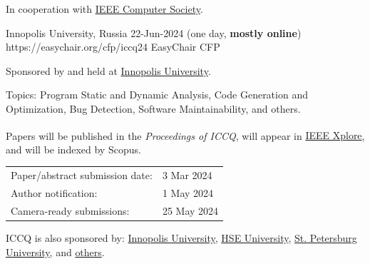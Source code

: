 \documentclass{../cfp}
\begin{document}
\PrintLogo{}



In cooperation
with
\href{https://conferences.ieee.org/conferences_events/conferences/conferencedetails/60895}{IEEE Computer Society}.

\vspace{6pt}

\PrintAddress
  {Innopolis University, Russia}
  {22-Jun-2024 (one day, \textbf{mostly online})}
  {https://easychair.org/cfp/iccq24}
  {EasyChair CFP}

\vspace{12pt}
%
%
\vspace{12pt}

Sponsored by and held at \href{https://innopolis.university/}{Innopolis University}.

Topics: Program Static and Dynamic Analysis,
Code Generation and Optimization,
Bug Detection, Software Maintainability, and others.

Papers will be published in the \textit{Proceedings of ICCQ},
will appear in \href{https://ieeexplore.ieee.org/Xplore/home.jsp}{IEEE Xplore\textsuperscript{\textregistered}},
and will be indexed by Scopus.

\begin{tabular}{@{}ll}
Paper/abstract submission date: & 3 Mar 2024 \\
Author notification: & 1 May 2024 \\
Camera-ready submissions: & 25 May 2024
\end{tabular}

\vspace{6pt}
ICCQ is also sponsored by:
\href{https://innopolis.university/}{Innopolis University},
\href{https://www.hse.ru/en/}{HSE University},
\href{https://english.spbu.ru/}{St. Petersburg University},
and \href{https://www.iccq.ru/2024.html#partners}{others}.
\end{document}
